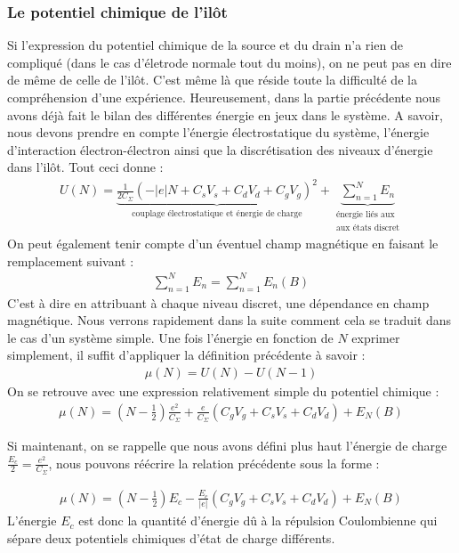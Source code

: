 \subsubsection{Le potentiel chimique de l'il\^ot}
Si l'expression du potentiel chimique de la source et du drain n'a rien de compliqué (dans le cas d'életrode normale tout du moins), on ne peut pas en dire de m\^eme de celle de l'il\^ot. C'est m\^eme là que réside toute la difficulté de la compréhension d'une expérience. Heureusement, dans la partie précédente nous avons déjà fait le bilan des différentes énergie en jeux dans le système. A savoir, nous devons prendre en compte l'énergie électrostatique du système, l'énergie d'interaction électron-électron ainsi que la discrétisation des niveaux d'énergie dans l'il\^ot. Tout ceci donne :
\begin{eqnarray}
U(N) = \underbrace{\frac{1}{2C_{\Sigma}} (-|e|N + C_sV_s + C_dV_d + C_gV_g)^2}_{\text{couplage électrostatique et énergie de charge}}
+ 
\underbrace{\sum_{n=1}^{N} E_n}_{\substack{\text{énergie liés aux} \\\text{aux états discret}}}
\end{eqnarray}
On peut également tenir compte d'un éventuel champ magnétique en faisant le remplacement suivant :
\begin{eqnarray}
\sum_{n=1}^N E_n = \sum_{n=1}^N E_n(B) \nonumber
\end{eqnarray}
C'est à dire en attribuant à chaque niveau discret, une dépendance en champ magnétique. Nous verrons rapidement dans la suite comment cela se traduit dans le cas d'un système simple. Une fois l'énergie en fonction de $N$ exprimer simplement, il suffit d'appliquer la définition précédente à savoir :
\begin{eqnarray}
\mu(N) = U(N) - U(N-1) \nonumber
\end{eqnarray}
On se retrouve avec une expression relativement simple du potentiel chimique :
\begin{eqnarray}
\mu(N) = (N-\frac{1}{2})\frac{e^2}{C_{\Sigma}}
+ 
\frac{e}{C_{\Sigma}}(C_gV_g + C_sV_s + C_dV_d)
+
E_N(B)
\end{eqnarray}

Si maintenant, on se rappelle que nous avons défini plus haut l'énergie de charge $\frac{E_c}{2} = \frac{e^2}{C_{\Sigma}}$, nous pouvons réécrire la relation précédente sous la forme :

\begin{eqnarray}
\mu(N) = (N-\frac{1}{2})E_c
- 
\frac{E_c}{|e|}(C_gV_g + C_sV_s + C_dV_d)
+
E_N(B)
\end{eqnarray}
L'énergie $E_c$ est donc la quantité d'énergie d\^u à la répulsion Coulombienne qui sépare deux potentiels chimiques d'état de charge différents.

